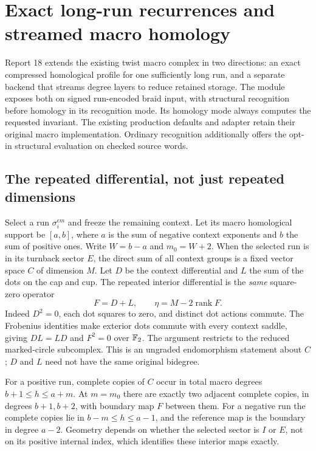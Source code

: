 \section{Exact long-run recurrences and streamed macro homology}
\label{sec:twist-continuation}

Report 18 extends the existing twist macro complex in two directions:
an exact compressed homological profile for one sufficiently long run, and
a separate backend that streams degree layers to reduce retained storage.
The module  exposes both on signed
run-encoded braid input, with structural recognition before homology in its
recognition mode. Its homology mode always computes the requested invariant.
The existing production defaults and  adapter retain
their original macro implementation. Ordinary recognition additionally offers
the opt-in  structural evaluation on checked source words.

\subsection{The repeated differential, not just repeated dimensions}
Select a run $\sigma_i^{\epsilon m}$ and freeze the remaining context.
Let its macro homological support be $[a,b]$, where
$a$ is the sum of negative context exponents and $b$ the sum of positive
ones. Write $W=b-a$ and $m_0=W+2$.
When the selected run is in its turnback sector $E$, the direct sum of all
context groups is a fixed vector space $C$ of dimension $M$. Let $D$ be
the context differential and $L$ the sum of the dots on the cap and cup.
The repeated interior differential is the \emph{same} square-zero operator
\[
 F=D+L,\qquad \eta=M-2\operatorname{rank}F.
\]
Indeed $D^2=0$, each dot squares to zero, and distinct dot actions commute.
The Frobenius identities make exterior dots commute with every context
saddle, giving $DL=LD$ and $F^2=0$ over $\mathbb{F}_2$. The argument restricts to
the reduced marked-circle subcomplex. This is an ungraded endomorphism
statement about $C$; $D$ and $L$ need not have the same original bidegree.

For a positive run, complete copies of $C$ occur in total macro degrees
$b+1\le h\le a+m$. At $m=m_0$ there are exactly two adjacent complete
copies, in degrees $b+1,b+2$, with boundary map $F$ between them.
For a negative run the complete copies lie in $b-m\le h\le a-1$,
and the reference map is the boundary in degree $a-2$.
Geometry depends on whether the selected sector is $I$ or $E$, not on its
positive internal index, which identifies these interior maps exactly.


